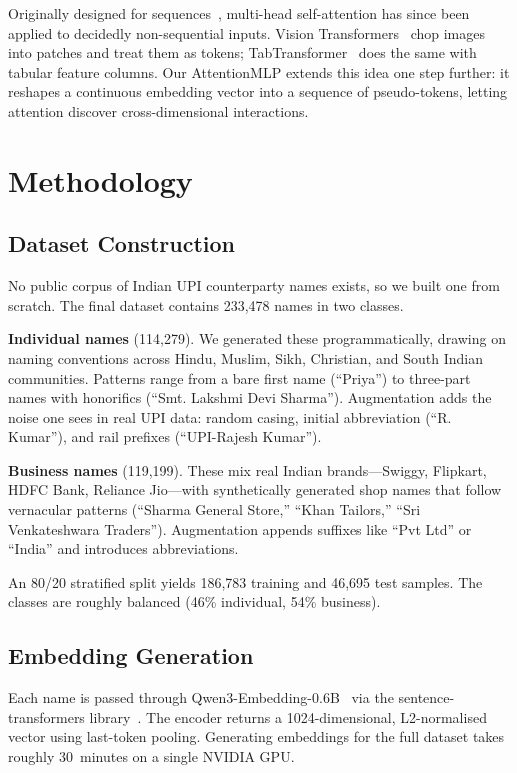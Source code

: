 \documentclass[conference]{IEEEtran}
\begin{document}
Originally designed for sequences~\cite{vaswani2017attention}, multi-head self-attention has since been applied to decidedly non-sequential inputs. Vision Transformers~\cite{dosovitskiy2021vit} chop images into patches and treat them as tokens; TabTransformer~\cite{huang2020tabtransformer} does the same with tabular feature columns. Our AttentionMLP extends this idea one step further: it reshapes a continuous embedding vector into a sequence of pseudo-tokens, letting attention discover cross-dimensional interactions.

\section{Methodology}
\label{sec:method}

\subsection{Dataset Construction}

No public corpus of Indian UPI counterparty names exists, so we built one from scratch. The final dataset contains 233{,}478 names in two classes.

\textbf{Individual names} (114{,}279). We generated these programmatically, drawing on naming conventions across Hindu, Muslim, Sikh, Christian, and South Indian communities. Patterns range from a bare first name (``Priya'') to three-part names with honorifics (``Smt. Lakshmi Devi Sharma''). Augmentation adds the noise one sees in real UPI data: random casing, initial abbreviation (``R. Kumar''), and rail prefixes (``UPI-Rajesh Kumar'').

\textbf{Business names} (119{,}199). These mix real Indian brands---Swiggy, Flipkart, HDFC Bank, Reliance Jio---with synthetically generated shop names that follow vernacular patterns (``Sharma General Store,'' ``Khan Tailors,'' ``Sri Venkateshwara Traders''). Augmentation appends suffixes like ``Pvt Ltd'' or ``India'' and introduces abbreviations.

An 80/20 stratified split yields 186{,}783 training and 46{,}695 test samples. The classes are roughly balanced (46\% individual, 54\% business).

\subsection{Embedding Generation}

Each name is passed through Qwen3-Embedding-0.6B~\cite{qwen3} via the sentence-transformers library~\cite{reimers2019sentence}. The encoder returns a 1024-dimensional, L2-normalised vector using last-token pooling. Generating embeddings for the full dataset takes roughly 30~minutes on a single NVIDIA GPU.
\end{document}
